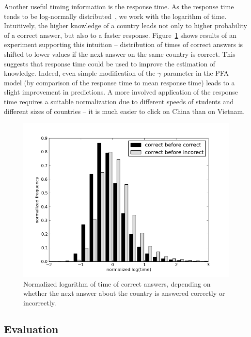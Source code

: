 \documentclass{edm_template}
\begin{document}
Another useful timing information is the response time. As the response time
tends to be log-normally distributed~\cite{its12,van2006lognormal}, we work
with the logarithm of time. Intuitively, the higher knowledge of a country
leads not only to higher probability of a correct answer, but also to a faster
response. Figure~\ref{fig:timing-information} shows results of an experiment
supporting this intuition -- distribution of times of correct answers is
shifted to lower values if the next answer on the same country is correct. This
suggests that response time could be used to improve the estimation of
knowledge. Indeed, even simple modification of the $\gamma$ parameter in the
PFA model (by comparison of the response time to mean response time) leads to a
slight improvement in predictions. A more involved application of the response
time requires a suitable normalization due to different speeds of students and
different sizes of countries -- it is much easier to click on China than on
Vietnam.

\begin{figure}[t]
  \centering

  \includegraphics[width=\linewidth]{edm-2014-geography-models/response-time-pattern-gray}
  \caption{Normalized logarithm of time of correct answers, depending on
    whether the next answer about the country is answered correctly or
    incorrectly. }
  \label{fig:timing-information}
\end{figure}



\subsection{Evaluation}
\end{document}
